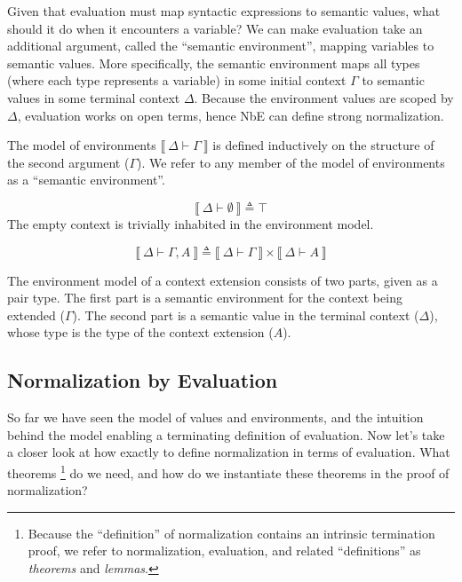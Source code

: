 \documentclass[runningheads,a4paper]{llncs}
\newenvironment{mydefinition}[3]
{ \begin{mydefinition'}[#1] \label{def:#2}
  \hfill\break
  #3
}
{ \end{mydefinition'} }
\def\cross{\times}
\def\dfn{\triangleq}
\def\emp{\emptyset}
\newcommand{\els}[1]{\llbracket ~ #1 ~ \rrbracket}
\newcommand{\dtypm}[1]{\els{\Delta \vdash #1}}
\def\menv{\dmenv{\Gamma}}
\newcommand{\dmenv}[1]{\els{\Delta \vdash #1}}
\begin{document}
Given that evaluation must map syntactic expressions to semantic values,
what should it do when it encounters a variable? We can make
evaluation take an additional argument, called the
``semantic environment'', mapping variables to semantic values. More
specifically, the semantic environment maps all types (where each type
represents a variable) in some initial context $\Gamma$ to semantic
values in some terminal context $\Delta$. Because the environment
values are scoped by $\Delta$, evaluation works on open terms,
hence NbE can define strong normalization.

\begin{mydefinition}{Semantic Environments}{menv}
{
The model of environments $\menv$ is defined inductively on the structure
of the second argument ($\Gamma$). We refer to any member of the model
of environments as a ``semantic environment''.
}

\begin{mycase}
$$
\dmenv{\emp} \dfn \top
$$
The empty context is trivially inhabited in the environment model.
\end{mycase}

\begin{mycase}
$$
\dmenv{\Gamma, A} \dfn \dmenv{\Gamma} \cross \dtypm{A}
$$

The environment model of a context extension consists of two parts,
given as a pair type. The first part
is a semantic environment for the context being extended ($\Gamma$). The second part
is a semantic value in the terminal context ($\Delta$),
whose type is the type of the context extension ($A$).

\end{mycase}

\end{mydefinition}

\subsection{Normalization by Evaluation}

So far we have seen the model of values and environments, and the
intuition behind the model enabling a terminating definition of evaluation.
Now let's take a closer look at how exactly to define normalization in
terms of evaluation. What theorems 
\footnote{Because the ``definition'' of normalization contains an
intrinsic termination proof, we refer to normalization, evaluation, and
related ``definitions'' as \textit{theorems} and \textit{lemmas}.}
do we need, and how do we instantiate these theorems in the proof of
normalization?
\end{document}
